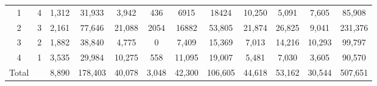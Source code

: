 \begin{table}[!htbp]
\begin{center}
{\begin{tabular}{@{}|cc|ccccccccc|c|@{}}
\midrule
 1 & 4 & 1,312 & 31,933 & 3,942& 436 & 6915 & 18424 & 10,250 & 5,091 & 7,605 & 85,908\\
 2 & 3 & 2,161 & 77,646 & 21,088 & 2054 & 16882 & 53,805 & 21,874 & 26,825 & 9,041 & 231,376  \\
 3 & 2 & 1,882 & 38,840 & 4,775 & 0 & 7,409& 15,369 & 7,013 & 14,216 & 10,293 & 99,797 \\
 4 & 1 & 3,535 & 29,984 & 10,275 & 558 & 11,095 & 19,007 & 5,481 & 7,030 & 3,605 & 90,570 \\
\midrule
Total & & 8,890 & 178,403 & 40,078 & 3,048 & 42,300 & 106,605 & 44,618 & 53,162 & 30,544 & 507,651  \\
\bottomrule
\end{tabular}}
\end{center}
\label{tbl:folds}
\end{table}